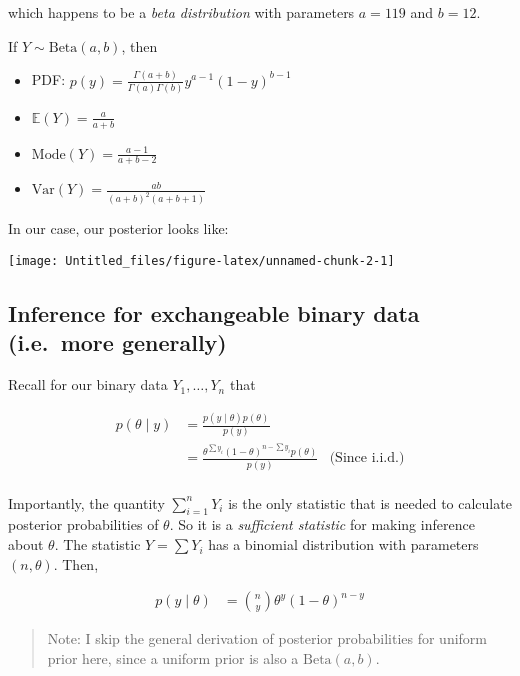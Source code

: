 \documentclass[
]{article}
\providecommand{\tightlist}{%
  \setlength{\itemsep}{0pt}\setlength{\parskip}{0pt}}
\begin{document}
which happens to be a \emph{beta distribution} with parameters
\(a = 119\) and \(b = 12\).

If \(Y \sim \text{Beta}(a, b)\), then

\begin{itemize}
\tightlist
\item
  PDF:
  \(p(y) = \frac{\Gamma(a + b)}{\Gamma(a)\Gamma(b)} y^{a - 1} (1 - y)^{b - 1}\)
\item
  \(\mathbb{E}(Y) = \frac{a}{a + b}\)
\item
  \(\text{Mode}(Y) = \frac{a - 1}{a + b - 2}\)
\item
  \(\text{Var}(Y) = \frac{ab}{(a + b)^2 (a + b + 1)}\)
\end{itemize}

In our case, our posterior looks like:

\begin{center}\texttt{[image: Untitled\_files/figure-latex/unnamed-chunk-2-1]} \end{center}

\hypertarget{inference-for-exchangeable-binary-data-i.e.-more-generally}{%
\subsection{Inference for exchangeable binary data (i.e.~more
generally)}\label{inference-for-exchangeable-binary-data-i.e.-more-generally}}

Recall for our binary data \(Y_1, \dots, Y_n\) that

\begin{align}
p(\theta \mid y) &= \frac{p(y \mid \theta) p(\theta)}{p(y)} \\
&= \frac{\theta^{\sum y_i} (1 - \theta)^{n - \sum y_i} p(\theta)}{p(y)} & \text{(Since i.i.d.)} \\
\end{align}

Importantly, the quantity \(\sum_{i = 1}^n Y_i\) is the only statistic
that is needed to calculate posterior probabilities of \(\theta\). So it
is a \emph{sufficient statistic} for making inference about \(\theta\).
The statistic \(Y = \sum Y_i\) has a binomial distribution with
parameters \((n, \theta)\). Then,

\begin{align}
p(y \mid \theta) &= {n \choose y} \theta^y (1 - \theta)^{n - y}
\end{align}

\begin{quote}
Note: I skip the general derivation of posterior probabilities for
uniform prior here, since a uniform prior is also a
\(\text{Beta}(a, b)\).
\end{quote}
\end{document}
